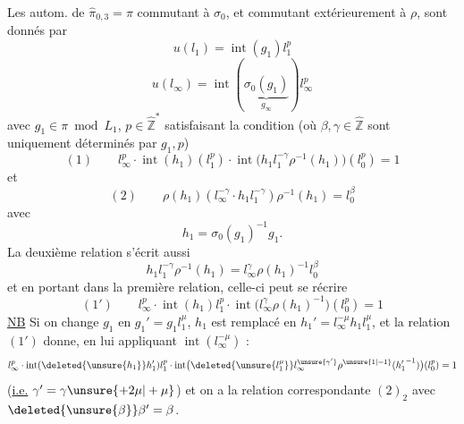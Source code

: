 Les autom.  de $\hat\pi_{0,3}=\pi$ commutant à $\sigma_0$, et commutant extérieurement à $\rho$, sont donnés par
\[
u(l_1)=\operatorname{int}(g_1)l_1^{p}
\]
\[
u(l_\infty)=\operatorname{int}(\underbrace{\sigma_0(g_1)}_{g_\infty})l_\infty^{p}
\]
avec $g_1\in\pi\bmod L_1$, $p\in\hat{\mathbb Z}^{*}$ satisfaisant la condition (où $\beta,\gamma\in\hat{\mathbb Z}$ sont uniquement déterminés par $g_1,p$)
\[
(1)\qquad\boxed{l_\infty^{p}\cdot\operatorname{int}(h_1)(l_1^{p})\cdot\operatorname{int}\bigl(h_1l_1^{-\gamma}\rho^{-1}(h_1)\bigr)(l_0^{p})=1}
\]
et
\[
(2)\qquad\boxed{\rho(h_1)(l_\infty^{-\gamma}\cdot h_1l_1^{-\gamma})\rho^{-1}(h_1)=l_0^\beta}
\]
avec
\[
h_1=\sigma_0(g_1)^{-1}g_1.
\]
La deuxième relation s'écrit aussi
\[
h_1l_1^{-\gamma}\rho^{-1}(h_1)=l_\infty^\gamma\rho(h_1)^{-1}l_0^\beta
\]
et en portant dans la première relation, celle-ci peut se récrire
\[
(1')\qquad\boxed{l_\infty^{p}\cdot\operatorname{int}(h_1)l_1^{p}\cdot\operatorname{int}\bigl(l_\infty^\gamma\rho(h_1)^{-1}\bigr)(l_0^{p})=1}
\]
\uline{NB} Si on change $g_1$ en $g_1'=g_1l_1^\mu$, $h_1$ est remplacé en $h_1'=l_\infty^{-\mu}h_1l_1^\mu$, et la relation $(1')$ donne, en lui appliquant $\operatorname{int}(l_\infty^{-\mu})$ :
\[
l_\infty^{p}\cdot\operatorname{int}(\deleted{\unsure{h_1}}h_1')l_1^{p}\cdot\operatorname{int}\bigl(\deleted{\unsure{l_1^\mu}}l_\infty^{\unsure{\gamma'}}\rho^{\unsure{1|-1}}({h_1'}^{-1})\bigr)(l_0^{p})=1
\]
(\uline{i.e.} \uline{$\gamma'=\gamma\unsure{+2\mu|+\mu}$}) et on a la relation correspondante $(2)_2$ avec $\deleted{\unsure{\beta}}\beta'=\beta$.



